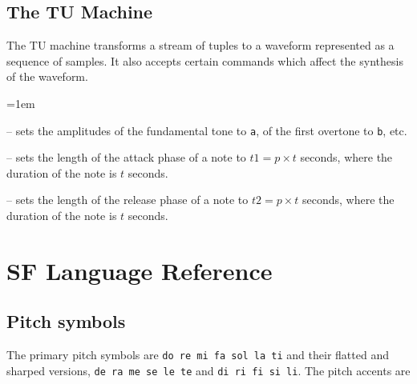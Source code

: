 \documentclass[11pt]{amsart}
\begin{document}
\subsection{The TU Machine}

The TU machine transforms a stream of tuples to a waveform represented as
a sequence of samples.  It also accepts certain commands which affect the 
synthesis of the waveform.

\begin{description}
  \parskip=1em
  \item[{\tt @harmonic:a:b:c:...}] -- sets the amplitudes of the fundamental tone
   to {\tt a}, of the first overtone to {\tt b}, etc.
   
  \item[{\tt @attack:p}] -- sets the length of the attack phase of a note to 
  $t1 = p\times t$ seconds, where the duration of the note is $t$ seconds.
  
  \item[{\tt @release:p}] -- sets the length of the release phase of a note to 
  $t2 = p\times t$ seconds, where the duration of the note is $t$ seconds.
  
\end{description}


\section{SF Language Reference}
\label{sec:SFLR}

\subsection{Pitch symbols}

The primary pitch symbols are {\tt do re mi fa sol la ti} and their
flatted and sharped versions, {\tt de ra me se le te} and
{\tt di ri fi si li}.  The pitch accents are
\end{document}
